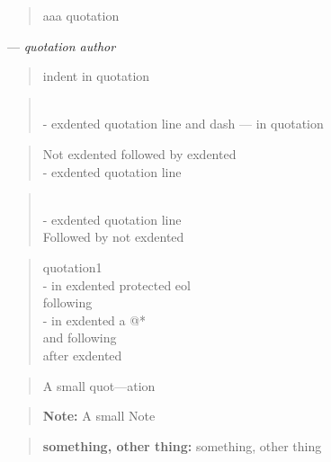 \documentclass{book}
\begin{document}
\begin{quote}
aaa quotation
\end{quote}
\begin{center}
--- \emph{quotation author}
\end{center}

\begin{quote}
indent in quotation
\end{quote}

\begin{quote}
\\
\hbox{\kern -\leftmargin}%
exdented quotation line   and dash --- in quotation
\\
\end{quote}

\begin{quote}
Not exdented followed by exdented
\\
\hbox{\kern -\leftmargin}%
exdented quotation line
\\
\end{quote}

\begin{quote}
\\
\hbox{\kern -\leftmargin}%
exdented quotation line
\\
Followed by not exdented 
\end{quote}

\begin{quote}
quotation1
\\
\hbox{\kern -\leftmargin}%
in exdented protected eol \ {}
\\
following
\\
\hbox{\kern -\leftmargin}%
in exdented a @* \leavevmode{}\\ and following
\\
after exdented
\end{quote}

\begin{quote}
\begin{footnotesize}
A small quot---ation
\end{footnotesize}
\end{quote}

\begin{quote}
\begin{footnotesize}
\textbf{Note:} A small Note
\end{footnotesize}
\end{quote}

\begin{quote}
\begin{footnotesize}
\textbf{something, other thing:} something, other thing
\end{footnotesize}
\end{quote}
\end{document}
